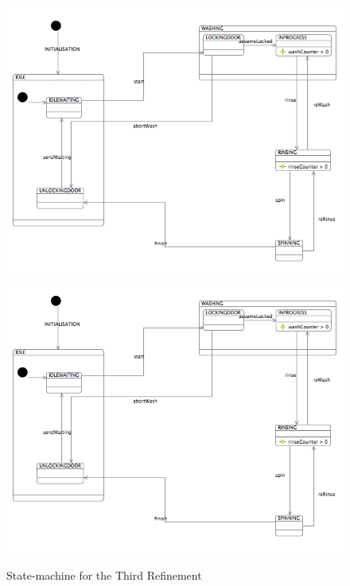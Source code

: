  \begin{figure}[!htbp]
  \centering
  \ifplastex
  \includegraphics[width=1024]{figures/image40.png}
  \else
  \includegraphics[width=1\textwidth]{figures/image40.png}
  \fi
  \caption{State-machine for the Third Refinement }
  \label{fig:StatemachineForTheThirdRefinement}
\end{figure} 
 

